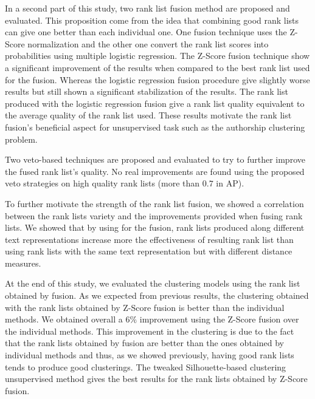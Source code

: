 In a second part of this study, two rank list fusion method are proposed and evaluated.
This proposition come from the idea that combining good rank lists can give one better than each individual one.
One fusion technique uses the Z-Score normalization and the other one convert the rank list scores into probabilities using multiple logistic regression.
The Z-Score fusion technique show a significant improvement of the results when compared to the best rank list used for the fusion.
Whereas the logistic regression fusion procedure give slightly worse results but still shown a significant stabilization of the results.
The rank list produced with the logistic regression fusion give a rank list quality equivalent to the average quality of the rank list used.
These results motivate the rank list fusion's beneficial aspect for unsupervised task such as the authorship clustering problem.

Two veto-based techniques are proposed and evaluated to try to further improve the fused rank list's quality.
No real improvements are found using the proposed veto strategies on high quality rank lists (more than $0.7$ in AP).

To further motivate the strength of the rank list fusion, we showed a correlation between the rank lists variety and the improvements provided when fusing rank lists.
We showed that by using for the fusion, rank lists produced along different text representations increase more the effectiveness of resulting rank list than using rank lists with the same text representation but with different distance measures.

At the end of this study, we evaluated the clustering models using the rank list obtained by fusion.
As we expected from previous results, the clustering obtained with the rank lists obtained by Z-Score fusion is better than the individual methods.
We obtained overall a $6\%$ improvement using the Z-Score fusion over the individual methods.
This improvement in the clustering is due to the fact that the rank lists obtained by fusion are better than the ones obtained by individual methods and thus, as we showed previously, having good rank lists tends to produce good clusterings.
The tweaked Silhouette-based clustering unsupervised method gives the best results for the rank lists obtained by Z-Score fusion.


